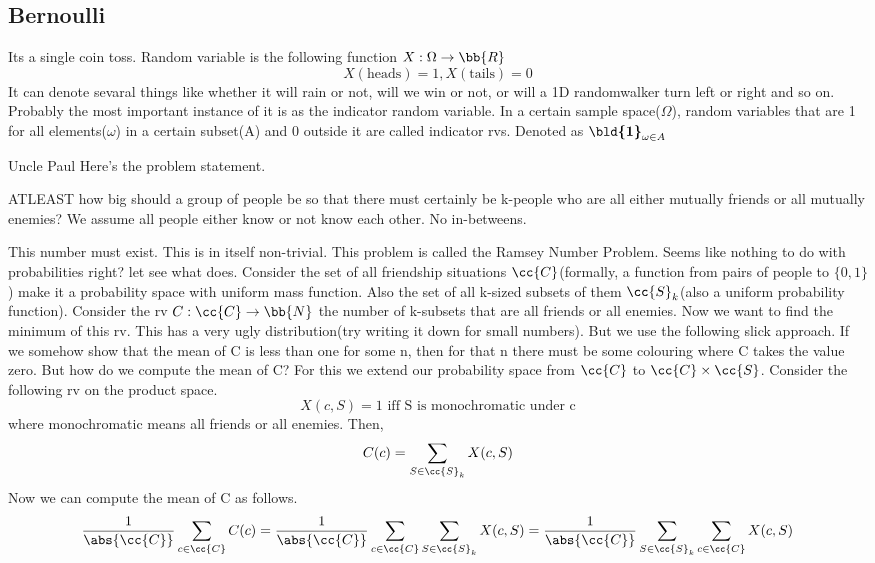 \documentclass{myclass}
\begin{document}
\subsection*{Bernoulli}
Its a single coin toss. Random variable is the following function $X:\Omega\to\bb{R}$
$$X(\text{heads})=1,X(\text{tails})=0$$
It can denote sevaral things like whether it will rain or not, will we win or not, or will a 1D randomwalker turn left or right and so on. Probably the most important instance of it is as the indicator random variable.
In a certain sample space($\Omega$), random variables that are 1 for all elements($\omega$) in a certain subset(A) and 0 outside it are called indicator rvs. Denoted as $\boldsymbol{\bld{1}}_{\omega\in A}$
\begin{yellowbox}{Uncle Paul}
    Here's the problem statement.
    \begin{center}
        ATLEAST how big should a group of people be so that there must certainly be k-people who are all either mutually friends or all mutually enemies?
        We assume all people either know or not know each other. No in-betweens.
    \end{center}
    This number must exist. This is in itself non-trivial. This problem is called the Ramsey Number Problem. Seems like nothing to do with probabilities right? let see what  does.
    Consider the set of all friendship situations $\cc{C}$(formally, a function from pairs of people to $\{0,1\}$) make it a probability space with uniform mass function. Also the set of all k-sized subsets of them $\cc{S}_k$(also a uniform probability function). Consider the rv $C:\cc{C}\to \bb{N}$ the number of k-subsets that are all friends or all enemies. Now we want to find the minimum of this rv.
    This has a very ugly distribution(try writing it down for small numbers). But we use the following slick approach. If we somehow show that the mean of C is less than one for some n, then for that n there must be some colouring where C takes the value zero. But how do we compute the mean of C? For this we extend our probability space from $\cc{C}$ to $\cc{C}\times\cc{S}$. Consider the following rv on the product space.
    $$X(c,S)=1 \text{ iff S is monochromatic under c}$$
    where monochromatic means all friends or all enemies.
    Then, $$C(c)=\sum_{S\in\cc{S}_k}X(c,S)$$
    Now we can compute the mean of C as follows.
    $$\frac{1}{\abs{\cc{C}}}\sum_{c\in \cc{C}}C(c)=\frac{1}{\abs{\cc{C}}}\sum_{c\in \cc{C}}\sum_{S\in\cc{S}_k}X(c,S)=\frac{1}{\abs{\cc{C}}}\sum_{S\in\cc{S}_k}\sum_{c\in \cc{C}}X(c,S)$$

\end{yellowbox}
\end{document}
